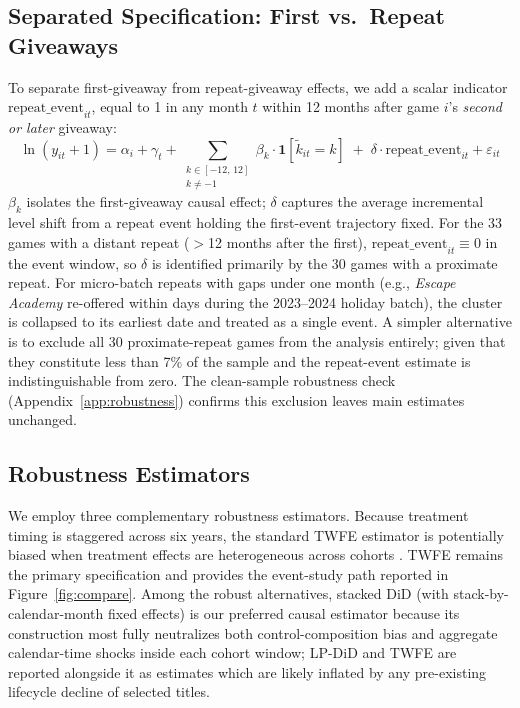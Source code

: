 \documentclass[11pt]{article}
\begin{document}
\subsection{Separated Specification: First vs.\ Repeat Giveaways}

To separate first-giveaway from repeat-giveaway effects, we add a scalar indicator
$\text{repeat\_event}_{it}$, equal to 1 in any month $t$ within 12 months after game
$i$'s \textit{second or later} giveaway:
\begin{equation}
\label{eq:separated}
\ln(y_{it} + 1) = \alpha_i + \gamma_t +
  \sum_{\substack{k \in [-12,\,12] \\ k \neq -1}}
  \beta_k \cdot \mathbf{1}[\tilde{k}_{it} = k]
  \;+\;
  \delta \cdot \text{repeat\_event}_{it}
  + \varepsilon_{it}
\end{equation}
$\beta_k$ isolates the first-giveaway causal effect; $\delta$ captures the average
incremental level shift from a repeat event holding the first-event trajectory fixed.
For the 33 games with a distant repeat ($>$12 months after the first), $\text{repeat\_event}_{it}
\equiv 0$ in the event window, so $\delta$ is identified primarily by the 30 games with
a proximate repeat. For micro-batch repeats with gaps under one month (e.g., \textit{Escape
Academy} re-offered within days during the 2023--2024 holiday batch), the cluster is
collapsed to its earliest date and treated as a single event. A simpler alternative
is to exclude all 30 proximate-repeat games from the analysis entirely; given that
they constitute less than 7\% of the sample and the repeat-event estimate is
indistinguishable from zero. The clean-sample robustness check
(Appendix~\ref{app:robustness}) confirms this exclusion leaves main estimates
unchanged.

\subsection{Robustness Estimators}

We employ three complementary robustness estimators.
Because treatment timing is staggered across six years, the standard TWFE estimator
is potentially biased when treatment effects are heterogeneous across cohorts
\citep{callaway2021}. TWFE remains the primary specification and provides the
event-study path reported in Figure~\ref{fig:compare}. Among the robust alternatives,
stacked DiD (with stack-by-calendar-month fixed effects) is our preferred causal
estimator because its construction most fully neutralizes both control-composition
bias and aggregate calendar-time shocks inside each cohort window; LP-DiD and TWFE
are reported alongside it as estimates which are
likely inflated by any pre-existing lifecycle decline of selected titles. 
\end{document}
